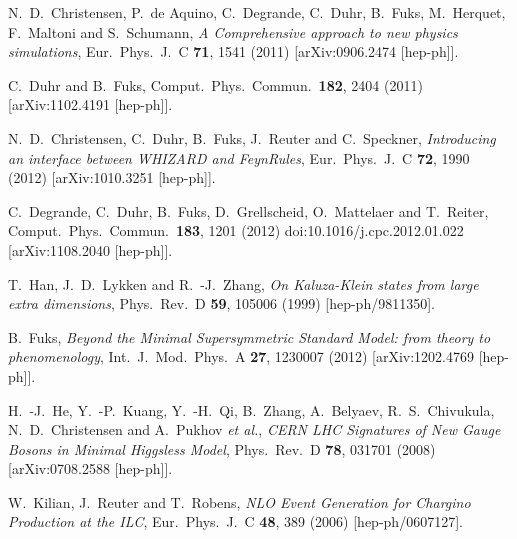 \documentclass[12pt]{book}
\begin{document}
\begin{thebibliography}{19}
  N.~D.~Christensen, P.~de Aquino, C.~Degrande, C.~Duhr, B.~Fuks,
  M.~Herquet, F.~Maltoni and S.~Schumann,
  {\em A Comprehensive approach to new physics simulations},
  Eur.\ Phys.\ J.\ C {\bf 71}, 1541 (2011)
  [arXiv:0906.2474 [hep-ph]].

  C.~Duhr and B.~Fuks,
  Comput.\ Phys.\ Commun.\  {\bf 182}, 2404 (2011)
  [arXiv:1102.4191 [hep-ph]].

  N.~D.~Christensen, C.~Duhr, B.~Fuks, J.~Reuter and C.~Speckner,
  {\em Introducing an interface between WHIZARD and FeynRules},
  Eur.\ Phys.\ J.\ C {\bf 72}, 1990 (2012)
  [arXiv:1010.3251 [hep-ph]].

  C.~Degrande, C.~Duhr, B.~Fuks, D.~Grellscheid, O.~Mattelaer and T.~Reiter,
  Comput.\ Phys.\ Commun.\  {\bf 183}, 1201 (2012)
  doi:10.1016/j.cpc.2012.01.022
  [arXiv:1108.2040 [hep-ph]].

  T.~Han, J.~D.~Lykken and R.~-J.~Zhang,
  {\em On Kaluza-Klein states from large extra dimensions},
  Phys.\ Rev.\ D {\bf 59}, 105006 (1999)
  [hep-ph/9811350].

  B.~Fuks,
  {\em Beyond the Minimal Supersymmetric Standard Model: from theory
    to phenomenology},
  Int.\ J.\ Mod.\ Phys.\ A {\bf 27}, 1230007 (2012)
  [arXiv:1202.4769 [hep-ph]].

  H.~-J.~He, Y.~-P.~Kuang, Y.~-H.~Qi, B.~Zhang, A.~Belyaev,
  R.~S.~Chivukula, N.~D.~Christensen and A.~Pukhov {\it et al.},
  {\em CERN LHC Signatures of New Gauge Bosons in Minimal Higgsless
    Model},
  Phys.\ Rev.\ D {\bf 78}, 031701 (2008)
  [arXiv:0708.2588 [hep-ph]].


  W.~Kilian, J.~Reuter and T.~Robens,
  {\em NLO Event Generation for Chargino Production at the ILC},
  Eur.\ Phys.\ J.\ C {\bf 48}, 389 (2006)
  [hep-ph/0607127].


\end{thebibliography}
\end{document}
